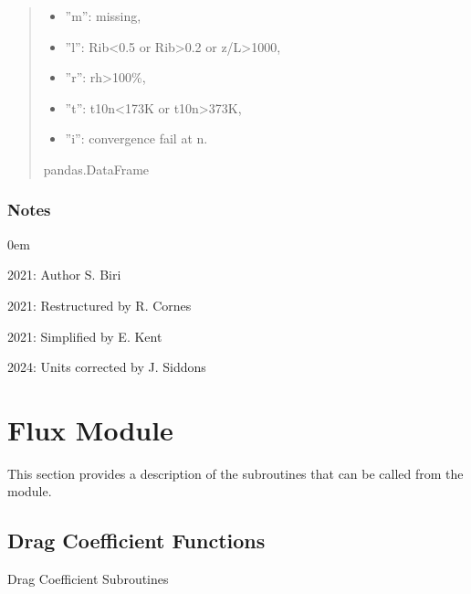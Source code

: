 \documentclass[letterpaper,10pt,english]{sphinxmanual}
\begin{document}
\begin{fulllineitems}
\begin{quote}
\begin{description}
\begin{enumerate}
\begin{itemize}
\item {}
\sphinxAtStartPar
”m”: missing,

\item {}
\sphinxAtStartPar
”l”: Rib\textless{}\sphinxhyphen{}0.5 or Rib\textgreater{}0.2 or z/L\textgreater{}1000,

\item {}
\sphinxAtStartPar
”r”: rh\textgreater{}100\%,

\item {}
\sphinxAtStartPar
”t”: t10n\textless{}173K or t10n\textgreater{}373K,

\item {}
\sphinxAtStartPar
”i”: convergence fail at n.

\end{itemize}

\end{enumerate}


\sphinxAtStartPar
pandas.DataFrame

\end{description}\end{quote}
\subsubsection*{Notes}

\begin{DUlineblock}{0em}
\item[] 2021: Author S. Biri
\item[] 2021: Restructured by R. Cornes
\item[] 2021: Simplified by E. Kent
\item[] 2024: Units corrected by J. Siddons
\end{DUlineblock}

\end{fulllineitems}



\section{Flux Module}
\label{\detokenize{users_guide:flux-module}}
\sphinxAtStartPar
This section provides a description of the sub\sphinxhyphen{}routines that can be called from the  module.


\subsection{Drag Coefficient Functions}
\label{\detokenize{users_guide:module-AirSeaFluxCode.flux_subs.drag_coef}}\label{\detokenize{users_guide:drag-coefficient-functions}}
\sphinxAtStartPar
Drag Coefficient Sub\sphinxhyphen{}routines
\end{document}
